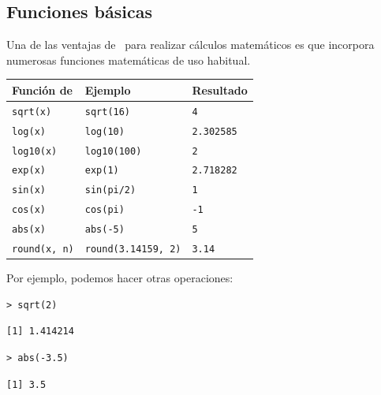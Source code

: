 \documentclass[11pt,a4paper]{article}
\newcommand{\R}{\textcolor{azuluc}{\faIcon{r-project}}}
\theoremstyle{exercise}
\begin{document}
\subsection{Funciones básicas}

Una de las ventajas de \R\ para realizar cálculos matemáticos es que incorpora numerosas funciones matemáticas de uso habitual.

\begin{center}
\begin{tabular}{|l|l|l|} \hline
    \textbf{Función de \R} &  \textbf{Ejemplo}        & \textbf{Resultado}    \\ \hline
    \texttt{sqrt(x)}    & \texttt{sqrt(16)}        & \texttt{4}         \\ \hline
    \texttt{log(x)}    & \texttt{log(10)}        & \texttt{2.302585}     \\ \hline
    \texttt{log10(x)} & \texttt{log10(100)}     & \texttt{2}            \\ \hline
    \texttt{exp(x)}    & \texttt{exp(1)}        & \texttt{2.718282}     \\ \hline
    \texttt{sin(x)}    & \texttt{sin(pi/2)}        & \texttt{1}         \\ \hline
    \texttt{cos(x)}    & \texttt{cos(pi)}        & \texttt{-1}        \\ \hline
    \texttt{abs(x)}    & \texttt{abs(-5)}        & \texttt{5}            \\ \hline
    \texttt{round(x, n)} & \texttt{round(3.14159, 2)} & \texttt{3.14} \\ \hline
\end{tabular}
\end{center}


\noindent Por ejemplo, podemos hacer otras operaciones:
\begin{lstlisting}[style=rconsole]
> sqrt(2)
\end{lstlisting}
\begin{lstlisting}[style=routput]
[1] 1.414214
\end{lstlisting}
\begin{lstlisting}[style=rconsole]
> abs(-3.5)
\end{lstlisting}
\begin{lstlisting}[style=routput]
[1] 3.5
\end{lstlisting}
\end{document}
